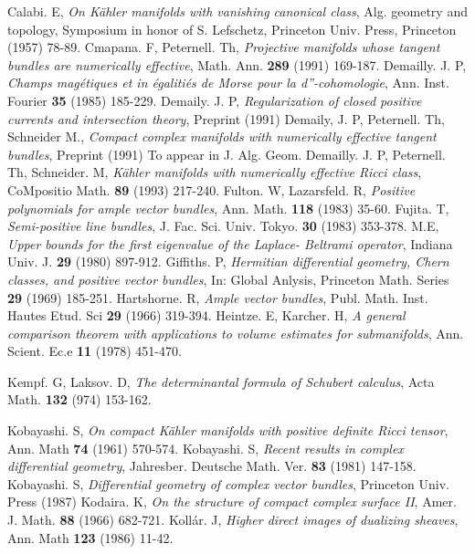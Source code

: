 \begin{thebibliography}{99}
 Calabi. E, \textit{On K\"ahler manifolds with vanishing canonical class}, Alg. geometry and topology, Symposium in honor of S. Lefschetz, Princeton Univ. Press, Princeton (1957) 78-89.
 Cmapana. F, Peternell. Th, \textit{Projective manifolds whose tangent bundles are numerically effective}, Math. Ann.  {\bf  289} (1991) 169-187.
 Demailly. J. P, \textit{Champs mag\'etiques et in \'egaliti\'es de Morse pour la d''-cohomologie}, Ann. Inst. Fourier {\bf 35} (1985) 185-229.
 Demaily. J. P, \textit{Regularization of closed positive currents and intersection theory}, Preprint (1991) 
 Demaily, J. P, Peternell. Th, Schneider M., \textit{Compact complex manifolds with numerically effective tangent bundles}, Preprint (1991) To appear in J. Alg. Geom.
 Demailly. J. P, Peternell. Th, Schneider. M, \textit{K\"ahler manifolds with numerically effective Ricci class}, CoMpositio Math. {\bf 89} (1993) 217-240.
 Fulton. W, Lazarsfeld. R, \textit{Positive polynomials for ample vector bundles}, Ann. Math.
{\bf 118} (1983) 35-60.
 Fujita. T, \textit{Semi-positive line bundles}, J. Fac. Sci. Univ. Tokyo. {\bf 30} (1983) 353-378.
 M.E, \textit{Upper bounds for the first eigenvalue of the Laplace- Beltrami operator}, Indiana Univ. J. {\bf 29} (1980) 897-912.
 Giffiths. P, \textit{Hermitian differential geometry, Chern classes, and positive vector 
bundles}, In: Global Anlysis, Princeton Math. Series {\bf 29} (1969) 185-251.
  Hartshorne. R, \textit{Ample vector bundles}, Publ. Math. Inst. Hautes Etud. Sci {\bf 29} (1966) 319-394.
  Heintze. E, Karcher. H, \textit{A general comparison theorem with applications to volume estimates for submanifolds}, Ann. Scient. Ec.e {\bf 11} (1978) 451-470.
 
  Kempf. G, Laksov. D, \textit{The determinantal formula of Schubert calculus}, Acta Math. {\bf 132} (974) 153-162.
 
  Kobayashi. S, \textit{On compact K\"ahler manifolds with positive definite Ricci tensor}, Ann. Math {\bf 74} (1961) 570-574.
  Kobayashi. S, \textit{Recent results in complex differential geometry}, Jahresber. Deutsche Math. Ver. {\bf 83} (1981) 147-158.
  Kobayashi. S, \textit{Differential geometry of complex vector bundles}, Princeton Univ. Press (1987)
 Kodaira. K, \textit{On the structure of compact complex surface II}, Amer. J. Math. {\bf 88} (1966) 682-721.
  Koll\'ar. J, \textit{Higher direct images of dualizing sheaves}, Ann. Math {\bf 123} (1986) 11-42.
 

\end{thebibliography}
